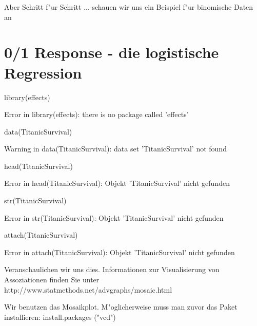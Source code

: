 \documentclass[a4paper,twoside]{tufte-book}\usepackage[]{graphicx}\usepackage[]{color}
\begin{document}
\begin{appendices}
Aber Schritt f"ur Schritt ... schauen wir uns ein Beispiel f"ur binomische Daten an


\section{0/1 Response - die logistische Regression}

\begin{Schunk}
\begin{Sinput}
library(effects) 
\end{Sinput}
\begin{Soutput}
Error in library(effects): there is no package called 'effects'
\end{Soutput}
\begin{Sinput}
data(TitanicSurvival)
\end{Sinput}
\begin{Soutput}
Warning in data(TitanicSurvival): data set 'TitanicSurvival' not found
\end{Soutput}
\begin{Sinput}
head(TitanicSurvival)
\end{Sinput}
\begin{Soutput}
Error in head(TitanicSurvival): Objekt 'TitanicSurvival' nicht gefunden
\end{Soutput}
\begin{Sinput}
str(TitanicSurvival)
\end{Sinput}
\begin{Soutput}
Error in str(TitanicSurvival): Objekt 'TitanicSurvival' nicht gefunden
\end{Soutput}
\begin{Sinput}
attach(TitanicSurvival)
\end{Sinput}
\begin{Soutput}
Error in attach(TitanicSurvival): Objekt 'TitanicSurvival' nicht gefunden
\end{Soutput}
\end{Schunk}

Veranschaulichen wir uns dies. Informationen zur Visualisierung von Assoziationen finden Sie unter http://www.statmethods.net/advgraphs/mosaic.html

Wir benutzen das Mosaikplot. M"oglicherweise muss man zuvor das Paket installieren: install.packages ("vcd")


\end{appendices}
\end{document}
